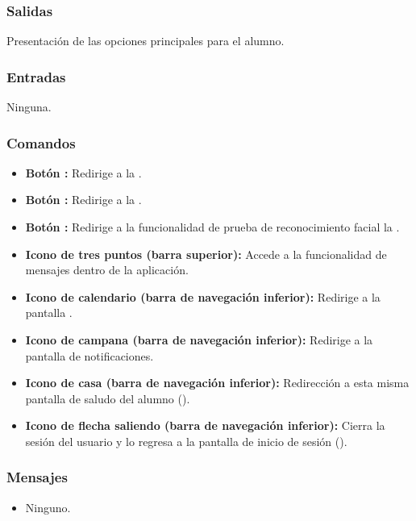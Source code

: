 \subsubsection{Salidas}
Presentación de las opciones principales para el alumno.

\subsubsection{Entradas}
Ninguna.

\subsubsection{Comandos}
\begin{itemize}
	\item \textbf{Botón :} Redirige a la .
	\item \textbf{Botón :} Redirige a la .
	\item \textbf{Botón :} Redirige a la funcionalidad de prueba de reconocimiento facial la .
	\item \textbf{Icono de tres puntos (barra superior):} Accede a la funcionalidad de mensajes dentro de la aplicación.
	\item \textbf{Icono de calendario (barra de navegación inferior):} Redirige a la pantalla .
	\item \textbf{Icono de campana (barra de navegación inferior):} Redirige a la pantalla de notificaciones.
	\item \textbf{Icono de casa (barra de navegación inferior):} Redirección a esta misma pantalla de saludo del alumno ().
	\item \textbf{Icono de flecha saliendo (barra de navegación inferior):} Cierra la sesión del usuario y lo regresa a la pantalla de inicio de sesión ().
\end{itemize}

\subsubsection{Mensajes}
\begin{itemize}
	\item Ninguno.
\end{itemize}

